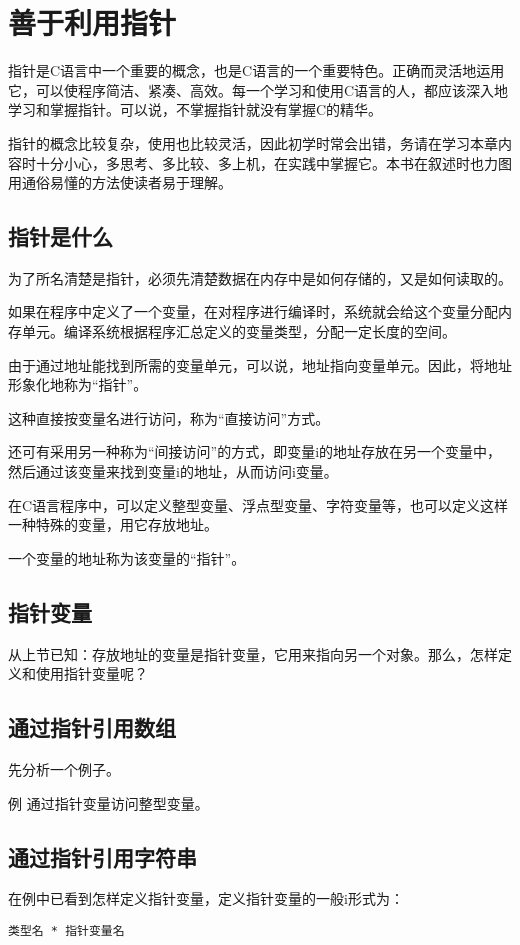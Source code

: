 \chapter{善于利用指针}
指针是C语言中一个重要的概念，也是C语言的一个重要特色。正确而灵活地运用它，可以使程序简洁、紧凑、高效。每一个学习和使用C语言的人，都应该深入地学习和掌握指针。可以说，不掌握指针就没有掌握C的精华。

指针的概念比较复杂，使用也比较灵活，因此初学时常会出错，务请在学习本章内容时十分小心，多思考、多比较、多上机，在实践中掌握它。本书在叙述时也力图用通俗易懂的方法使读者易于理解。
\section{指针是什么}
为了所名清楚是指针，必须先清楚数据在内存中是如何存储的，又是如何读取的。

如果在程序中定义了一个变量，在对程序进行编译时，系统就会给这个变量分配内存单元。编译系统根据程序汇总定义的变量类型，分配一定长度的空间。

由于通过地址能找到所需的变量单元，可以说，地址指向变量单元。因此，将地址形象化地称为“指针”。

这种直接按变量名进行访问，称为“直接访问”方式。

还可有采用另一种称为“间接访问”的方式，即变量i的地址存放在另一个变量中，然后通过该变量来找到变量i的地址，从而访问i变量。

在C语言程序中，可以定义整型变量、浮点型变量、字符变量等，也可以定义这样一种特殊的变量，用它存放地址。

一个变量的地址称为该变量的“指针”。
\section{指针变量}
从上节已知：存放地址的变量是指针变量，它用来指向另一个对象。那么，怎样定义和使用指针变量呢？
\section{通过指针引用数组}
先分析一个例子。

例 通过指针变量访问整型变量。
\section{通过指针引用字符串}
在例中已看到怎样定义指针变量，定义指针变量的一般i形式为：
\begin{lstlisting}
类型名 * 指针变量名
\end{lstlisting}

